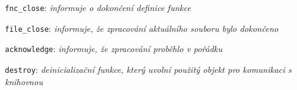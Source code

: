 \begin{myitemize}[itemsep=0pt,partopsep=0pt,parsep=0pt,topsep=0pt,label=\textbullet]
\begin{myitemize}[itemsep=0pt,partopsep=0pt,parsep=0pt,topsep=0pt,label=\textbullet]
\begin{myitemize}
\begin{myitemize}[itemsep=0pt,partopsep=0pt,parsep=0pt,topsep=0pt,label=\textbullet]
\begin{myitemize}[itemsep=0pt,partopsep=0pt,parsep=0pt,topsep=0pt,label=\textbullet]
\begin{myitemize}[itemsep=0pt,partopsep=0pt,parsep=0pt,topsep=0pt,label=\textbullet]
                    \end{myitemize}
                \end{myitemize}
              \item \texttt{fnc\_close}: \textit{informuje o dokončení definice funkce}
            \end{myitemize}
        \end{myitemize}
      \item \texttt{file\_close}: \textit{informuje, že zpracování aktuálního souboru bylo dokončeno}
    \end{myitemize}
  \item \texttt{acknowledge}: \textit{informuje, že zpracování proběhlo v pořádku}
  \item \texttt{destroy}: \textit{deinicializační funkce, který uvolní použitý objekt pro komunikaci s knihovnou}
\end{myitemize}

